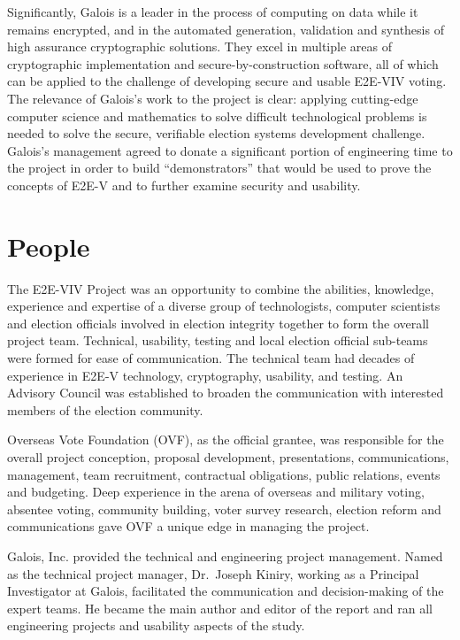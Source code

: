 Significantly, Galois is a leader in the process of computing on data
while it remains encrypted, and in the automated generation,
validation and synthesis of high assurance cryptographic solutions.
They excel in multiple areas of cryptographic implementation and
secure-by-construction software, all of which can be applied to the
challenge of developing secure and usable E2E-VIV voting. The
relevance of Galois’s work to the project is clear: applying
cutting-edge computer science and mathematics to solve difficult
technological problems is needed to solve the secure, verifiable
election systems development challenge. Galois’s management agreed to
donate a significant portion of engineering time to the project in
order to build “demonstrators” that would be used to prove the
concepts of E2E-V and to further examine security and usability.

\section{People}
\label{sec:people}

The E2E-VIV Project was an opportunity to combine the abilities,
knowledge, experience and expertise of a diverse group of
technologists, computer scientists and election officials involved in
election integrity together to form the overall project
team. Technical, usability, testing and local election official
sub-teams were formed for ease of communication. The technical team
had decades of experience in E2E-V technology, cryptography, usability,
and testing. An Advisory Council was established to broaden the
communication with interested members of the election community.

Overseas Vote Foundation (OVF), as the official grantee, was
responsible for the overall project conception, proposal development,
presentations, communications, management, team recruitment,
contractual obligations, public relations, events and budgeting. Deep
experience in the arena of overseas and military voting, absentee
voting, community building, voter survey research, election reform and
communications gave OVF a unique edge in managing the project.

Galois, Inc. provided the technical and engineering project
management. Named as the technical project manager, Dr.~Joseph Kiniry,
working as a Principal Investigator at Galois, facilitated the
communication and decision-making of the expert teams. He became the
main author and editor of the report and ran all engineering projects
and usability aspects of the study.

